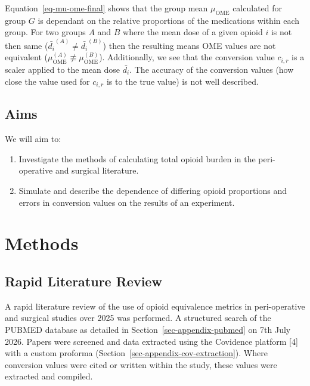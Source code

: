 \documentclass[
  letterpaper,
  DIV=11,
  numbers=noendperiod]{scrreprt}
\begin{document}
Equation~\ref{eq-mu-ome-final} shows that the group mean
\(\mu_{\text{OME}}\) calculated for group \(G\) is dependant on the
relative proportions of the medications within each group. For two
groups \(A\) and \(B\) where the mean dose of a given opioid \(i\) is
not then same (\(\bar{d_{i}}^{(A)} \neq \bar{d_{i}}^{(B)}\)) then the
resulting means OME values are not equivalent
(\(\mu_{\text{OME}}^{(A)} \not\equiv \mu_{\text{OME}}^{(B)}\)).
Additionally, we see that the conversion value \(c_{i,r}\) is a scaler
applied to the mean dose \({\bar{d_i}}\). The accuracy of the conversion
values (how close the value used for \(c_{i,r}\) is to the true value)
is not well described.

\section{Aims}\label{aims}

We will aim to:

\begin{enumerate}
\def\labelenumi{\arabic{enumi}.}
\item
  Investigate the methods of calculating total opioid burden in the
  peri-operative and surgical literature.
\item
  Simulate and describe the dependence of differing opioid proportions
  and errors in conversion values on the results of an experiment.
\end{enumerate}


\chapter{Methods}\label{methods}

\section{Rapid Literature Review}\label{rapid-literature-review}

A rapid literature review of the use of opioid equivalence metrics in
peri-operative and surgical studies over 2025 was performed. A
structured search of the PUBMED database as detailed in
Section~\ref{sec-appendix-pubmed} on 7th July 2026. Papers were screened
and data extracted using the Covidence platform {[}4{]} with a custom
proforma (Section~\ref{sec-appendix-cov-extraction}). Where conversion
values were cited or written within the study, these values were
extracted and compiled.
\end{document}
